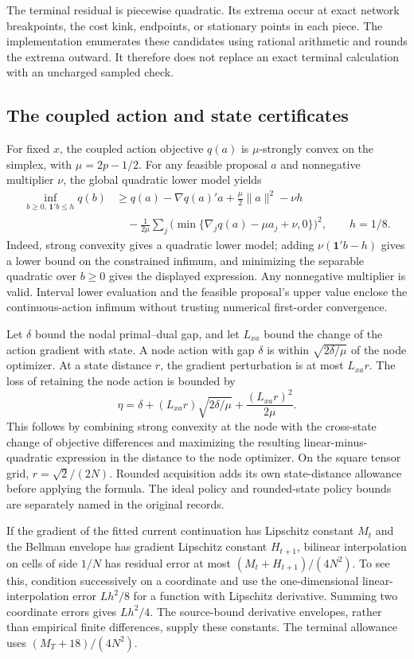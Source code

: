 \documentclass[ecta,nameyear,draft]{econsocart}
\begin{document}
The terminal residual is piecewise quadratic. Its extrema occur at exact network breakpoints, the cost kink, endpoints, or stationary points in each piece. The implementation enumerates these candidates using rational arithmetic and rounds the extrema outward. It therefore does not replace an exact terminal calculation with an uncharged sampled check.

\subsection{The coupled action and state certificates}
For fixed $x$, the coupled action objective $q(a)$ is $\mu$-strongly convex on the simplex, with $\mu=2p-1/2$. For any feasible proposal $a$ and nonnegative multiplier $\nu$, the global quadratic lower model yields
\begin{align*}
 \inf_{b\geq0,\,\mathbf1'b\leq h}q(b)
 &\geq q(a)-\nabla q(a)'a+\tfrac\mu2\|a\|^2-\nu h\\
 &\quad-\frac1{2\mu}\sum_j
          \bigl(\min\{\nabla_jq(a)-\mu a_j+\nu,0\}\bigr)^2,
 \qquad h=1/8.
\end{align*}
Indeed, strong convexity gives a quadratic lower model; adding $\nu(\mathbf1'b-h)$ gives a lower bound on the constrained infimum, and minimizing the separable quadratic over $b\geq0$ gives the displayed expression. Any nonnegative multiplier is valid. Interval lower evaluation and the feasible proposal's upper value enclose the continuous-action infimum without trusting numerical first-order convergence.

Let $\delta$ bound the nodal primal--dual gap, and let $L_{xa}$ bound the change of the action gradient with state. A node action with gap $\delta$ is within $\sqrt{2\delta/\mu}$ of the node optimizer. At a state distance $r$, the gradient perturbation is at most $L_{xa}r$. The loss of retaining the node action is bounded by
\[
 \eta=\delta+(L_{xa}r)\sqrt{2\delta/\mu}
                 +\frac{(L_{xa}r)^2}{2\mu}.
\]
This follows by combining strong convexity at the node with the cross-state change of objective differences and maximizing the resulting linear-minus-quadratic expression in the distance to the node optimizer. On the square tensor grid, $r=\sqrt2/(2N)$. Rounded acquisition adds its own state-distance allowance before applying the formula. The ideal policy and rounded-state policy bounds are separately named in the original records.

If the gradient of the fitted current continuation has Lipschitz constant $M_t$ and the Bellman envelope has gradient Lipschitz constant $H_{t+1}$, bilinear interpolation on cells of side $1/N$ has residual error at most $(M_t+H_{t+1})/(4N^2)$. To see this, condition successively on a coordinate and use the one-dimensional linear-interpolation error $Lh^2/8$ for a function with Lipschitz derivative. Summing two coordinate errors gives $Lh^2/4$. The source-bound derivative envelopes, rather than empirical finite differences, supply these constants. The terminal allowance uses $(M_T+18)/(4N^2)$.
\end{document}
